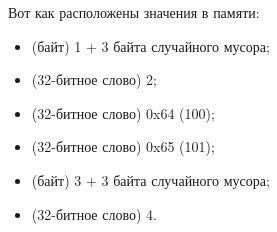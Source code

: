 Вот как расположены значения в памяти:
\begin{itemize}
\item {} (байт) 1 + 3 байта случайного мусора;
\item {} (32-битное слово) 2;
\item {} (32-битное слово) 0x64 (100);
\item {} (32-битное слово) 0x65 (101);
\item {} (байт) 3 + 3 байта случайного мусора;
\item {} (32-битное слово) 4.
\end{itemize}

